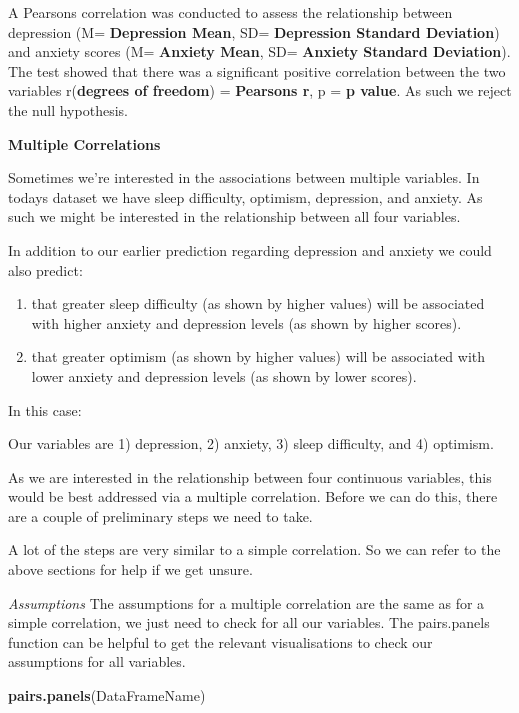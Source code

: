 \documentclass[
]{book}
\newenvironment{Shaded}{\begin{snugshade}}{\end{snugshade}}
\newcommand{\FunctionTok}[1]{\textcolor[rgb]{0.13,0.29,0.53}{\textbf{#1}}}
\newcommand{\NormalTok}[1]{#1}
\begin{document}
A Pearsons correlation was conducted to assess the relationship between depression (M= \textbf{Depression Mean}, SD= \textbf{Depression Standard Deviation}) and anxiety scores (M= \textbf{Anxiety Mean}, SD= \textbf{Anxiety Standard Deviation}). The test showed that there was a significant positive correlation between the two variables r(\textbf{degrees of freedom}) = \textbf{Pearsons r}, p = \textbf{p value}. As such we reject the null hypothesis.

\textbf{Multiple Correlations}

Sometimes we're interested in the associations between multiple variables. In todays dataset we have sleep difficulty, optimism, depression, and anxiety. As such we might be interested in the relationship between all four variables.

In addition to our earlier prediction regarding depression and anxiety we could also predict:

\begin{enumerate}
\def\labelenumi{\arabic{enumi})}
\item
  that greater sleep difficulty (as shown by higher values) will be associated with higher anxiety and depression levels (as shown by higher scores).
\item
  that greater optimism (as shown by higher values) will be associated with lower anxiety and depression levels (as shown by lower scores).
\end{enumerate}

In this case:

Our variables are 1) depression, 2) anxiety, 3) sleep difficulty, and 4) optimism.

As we are interested in the relationship between four continuous variables, this would be best addressed via a multiple correlation. Before we can do this, there are a couple of preliminary steps we need to take.

A lot of the steps are very similar to a simple correlation. So we can refer to the above sections for help if we get unsure.

\emph{Assumptions} The assumptions for a multiple correlation are the same as for a simple correlation, we just need to check for all our variables. The pairs.panels function can be helpful to get the relevant visualisations to check our assumptions for all variables.

\begin{Shaded}
\begin{Highlighting}[]
\FunctionTok{pairs.panels}\NormalTok{(DataFrameName)}
\end{Highlighting}
\end{Shaded}
\end{document}
